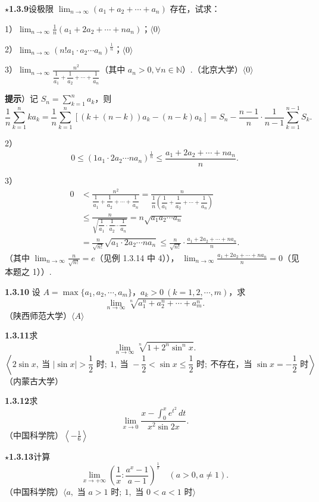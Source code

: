 \documentclass[UTF8, 12pt, fontset=fandol, oneside]{ctexart}
\begin{document}
\noindent\textbf{$\star$1.3.9}\quad 设极限 $\displaystyle\lim_{n\to\infty}(a_1+a_2+\cdots+a_n)$ 存在，试求：

1）$\displaystyle\lim_{n\to\infty}\frac1n(a_1+2a_2+\cdots+na_n)$；\quad $\langle0\rangle$

2）$\displaystyle\lim_{n\to\infty}(n!a_1\cdot a_2\cdots a_n)^{\frac1n}$；\quad $\langle0\rangle$

3）$\displaystyle\lim_{n\to\infty}\frac{n^2}{\dfrac1{a_1}+\dfrac1{a_2}+\cdots+\dfrac1{a_n}}$（其中 $a_n>0,\forall n\in\mathbb N$）.（北京大学）\quad $\langle0\rangle$

\noindent\textbf{提示}）记 $S_n=\sum_{k=1}^n a_k$，则
\[
  \frac1n\sum_{k=1}^nka_k
  =\frac1n\sum_{k=1}^n[(k+(n-k))a_k-(n-k)a_k]
  =S_n-\frac{n-1}{n}\cdot\frac1{n-1}\sum_{k=1}^{n-1}S_k.
\]

2）
\[
  0\le(1a_1\cdot2a_2\cdots na_n)^{\frac1n}
  \le\frac{a_1+2a_2+\cdots+na_n}{n}.
\]

3）
\[
\begin{aligned}
0&<\frac{n^2}{\dfrac1{a_1}+\dfrac1{a_2}+\cdots+\dfrac1{a_n}}
=\frac n{\dfrac1n\left(\dfrac1{a_1}+\dfrac1{a_2}+\cdots+\dfrac1{a_n}\right)}\\
&\le
\frac n{\sqrt{\dfrac1{a_1}\cdot\dfrac1{a_2}\cdots\dfrac1{a_n}}}
=n\sqrt{a_1a_2\cdots a_n}\\
&=\frac n{\sqrt{n!}}\sqrt{a_1\cdot2a_2\cdots na_n}
\le\frac n{\sqrt{n!}}\cdot
\frac{a_1+2a_2+\cdots+na_n}{n}.
\end{aligned}
\]
（其中 $\displaystyle\lim_{n\to\infty}\frac n{\sqrt{n!}}=e$（见例 1.3.14 中 4）），
$\displaystyle\lim_{n\to\infty}\frac{a_1+2a_2+\cdots+na_n}{n}=0$（见本题之 1））.

\noindent\textbf{1.3.10}\quad
设 $A=\max\{a_1,a_2,\cdots,a_m\}$，$a_k>0\ (k=1,2,\cdots,m)$，求
\[
  \lim_{n\to\infty}\sqrt[n]{a_1^n+a_2^n+\cdots+a_m^n}.
\]
（陕西师范大学）\quad $\langle A\rangle$

\noindent\textbf{1.3.11}\quad 求
\[
  \lim_{n\to\infty}\sqrt[n]{1+2^n\sin^nx}.
\]
\[
  \left\langle
  2\sin x,\ \text{当 }|\sin x|>\frac12\text{ 时};\ 
  1,\ \text{当 }-\frac12<\sin x\le\frac12\text{ 时};\
  \text{不存在，当 }\sin x=-\frac12\text{ 时}
  \right\rangle
\]
（内蒙古大学）

\noindent\textbf{1.3.12}\quad 求
\[
  \lim_{x\to0}\frac{x-\int_0^xe^{t^2}\,dt}{x^2\sin2x}.
\]
（中国科学院）\quad $\left\langle-\frac16\right\rangle$

\noindent\textbf{$\star$1.3.13}\quad 计算
\[
  \lim_{x\to+\infty}\left(\frac1x:\frac{a^x-1}{a-1}\right)^{\frac1x}
  \quad(a>0,a\ne1).
\]
（中国科学院）\quad $\langle a,\text{ 当 }a>1\text{ 时};\ 1,\text{ 当 }0<a<1\text{ 时}\rangle$
\end{document}
